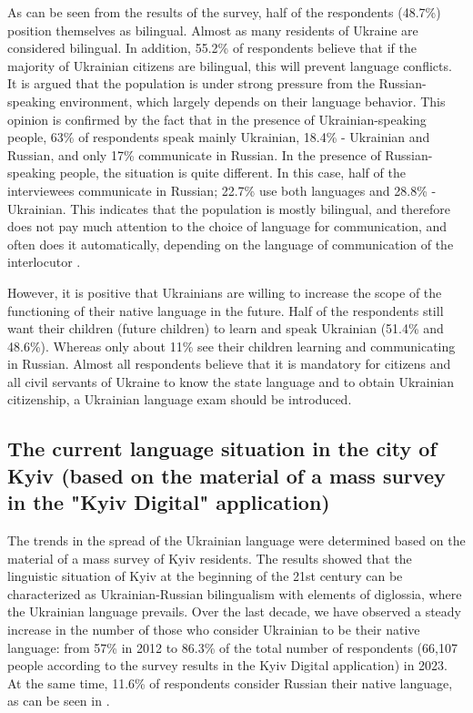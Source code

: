 \documentclass[english]{textolivre}
\begin{document}
As can be seen from the results of the survey, half of the respondents (48.7\%) position themselves as bilingual. Almost as many residents of Ukraine are considered bilingual. In addition, 55.2\% of respondents believe that if the majority of Ukrainian citizens are bilingual, this will prevent language conflicts. It is argued that the population is under strong pressure from the Russian-speaking environment, which largely depends on their language behavior. This opinion is confirmed by the fact that in the presence of Ukrainian-speaking people, 63\% of respondents speak mainly Ukrainian, 18.4\% - Ukrainian and Russian, and only 17\% communicate in Russian. In the presence of Russian-speaking people, the situation is quite different. In this case, half of the interviewees communicate in Russian; 22.7\% use both languages and 28.8\% - Ukrainian. This indicates that the population is mostly bilingual, and therefore does not pay much attention to the choice of language for communication, and often does it automatically, depending on the language of communication of the interlocutor \cite{matveieva2020}.

However, it is positive that Ukrainians are willing to increase the scope of the functioning of their native language in the future. Half of the respondents still want their children (future children) to learn and speak Ukrainian (51.4\% and 48.6\%). Whereas only about 11\% see their children learning and communicating in Russian. Almost all respondents believe that it is mandatory for citizens and all civil servants of Ukraine to know the state language and to obtain Ukrainian citizenship, a Ukrainian language exam should be introduced.

\subsection{The current language situation in the city of Kyiv (based on the material of a mass survey in the "Kyiv Digital" application)}

The trends in the spread of the Ukrainian language were determined based on the material of a mass survey of Kyiv residents. The results showed that the linguistic situation of Kyiv at the beginning of the 21st century can be characterized as Ukrainian-Russian bilingualism with elements of diglossia, where the Ukrainian language prevails. Over the last decade, we have observed a steady increase in the number of those who consider Ukrainian to be their native language: from 57\% in 2012 to 86.3\% of the total number of respondents (66,107 people according to the survey results in the Kyiv Digital application) in 2023. At the same time, 11.6\% of respondents consider Russian their native language, as can be seen in . 
\end{document}
